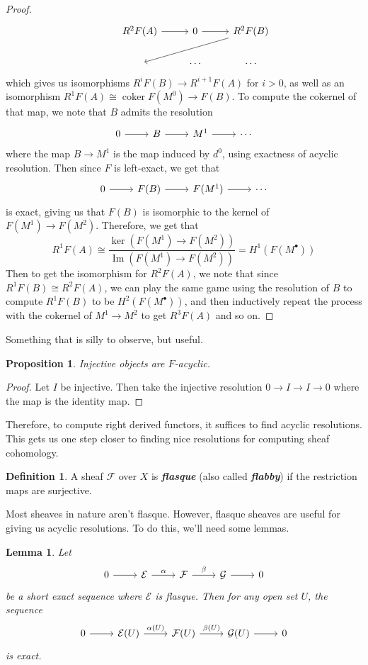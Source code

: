 \documentclass[psamsfonts, 12pt]{amsart}
\newtheorem{prop}[thm]{Proposition}
\newtheorem{lem}[thm]{Lemma}
\theoremstyle{definition}
\newtheorem{defn}[thm]{Definition}
\theoremstyle{remark}
\newcommand{\ib}[1]{\textbf{\textit{#1}}}
\DeclareMathOperator{\im}{Im}
\DeclareMathOperator{\coker}{coker}
\begin{document}
\begin{proof}
\[\begin{tikzcd}
& R^2F(A) \ar[r] & 0 \ar[r] & R^2F(B) \ar[dll] \\
& ~ & \cdots & \cdots
\end{tikzcd}\]
which gives us isomorphisms $R^iF(B) \to R^{i+1}F(A)$ for $i > 0$, as well as
an isomorphism $R^1F(A) \cong \coker F(M^0) \to F(B)$. To compute the
cokernel of that map, we note that $B$ admits the resolution
\[\begin{tikzcd}
0 \ar[r] & B \ar[r] & M^1 \ar[r] & \cdots
\end{tikzcd}\]
where the map $B \to M^1$ is the map induced by $d^0$, using exactness of acyclic
resolution. Then since $F$ is left-exact, we get that
\[\begin{tikzcd}
0 \ar[r] & F(B) \ar[r] & F(M^1) \ar[r] & \cdots
\end{tikzcd}\]
is exact, giving us that $F(B)$ is isomorphic to the kernel of $F(M^1) \to F(M^2)$.
Therefore, we get that
\[
R^1F(A) \cong \frac{\ker(F(M^1) \to F(M^2))}{\im(F(M^1) \to F(M^2))}
= H^1(F(M^\bullet))
\]
Then to get the isomorphism for $R^2F(A)$, we note that since
$R^1F(B) \cong R^2F(A)$, we can play the same game using the resolution of $B$
to compute $R^1F(B)$ to be $H^2(F(M^\bullet))$, and then inductively repeat
the process with the cokernel of $M^1 \to M^2$ to get $R^3F(A)$ and so on.
\end{proof}
%
Something that is silly to observe, but useful.
%
\begin{prop}
Injective objects are $F$-acyclic.
\end{prop}
%
\begin{proof}
Let $I$ be injective. Then take the injective resolution $0 \to I \to I \to 0$
where the map is the identity map.
\end{proof}
%
Therefore, to compute right derived functors, it suffices to find acyclic resolutions.
This gets us one step closer to finding nice resolutions for computing sheaf cohomology.
%
\begin{defn}
A sheaf $\mathcal{F}$ over $X$ is \ib{flasque} (also called \ib{flabby}) if
the restriction maps are surjective.
\end{defn}
%
Most sheaves in nature aren't flasque. However, flasque sheaves are useful for giving
us acyclic resolutions. To do this, we'll need some lemmas.
%
\begin{lem}
Let
\[\begin{tikzcd}
0 \ar[r] & \mathcal{E} \ar[r, "\alpha"] & \mathcal{F} \ar[r,"\beta"]
& \mathcal{G} \ar[r] & 0
\end{tikzcd}\]
be a short exact sequence where $\mathcal{E}$ is flasque. Then for any open set $U$,
the sequence
\[\begin{tikzcd}
0 \ar[r] & \mathcal{E}(U) \ar[r, "\alpha(U)"] & \mathcal{F}(U) \ar[r, "\beta(U)"]
& \mathcal{G}(U) \ar[r] & 0
\end{tikzcd}\]
is exact.
\end{lem}
\end{document}
